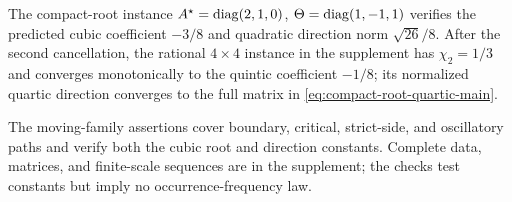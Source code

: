 The compact-root instance
\(A^\star=\operatorname{diag}(2,1,0)\), \(\Theta=\operatorname{diag}(1,-1,1)\) verifies the predicted
cubic coefficient \(-3/8\) and quadratic direction norm \(\sqrt{26}/8\).
After the second cancellation, the rational \(4\times4\) instance in the
supplement has \(\chi_2=1/3\) and converges monotonically to the quintic
coefficient \(-1/8\); its normalized quartic direction converges to the full
matrix in \eqref{eq:compact-root-quartic-main}.

The moving-family assertions cover boundary, critical, strict-side, and
oscillatory paths and verify both the cubic root and direction constants.
Complete data, matrices, and finite-scale sequences are in the supplement;
the checks test constants but imply no occurrence-frequency law.
